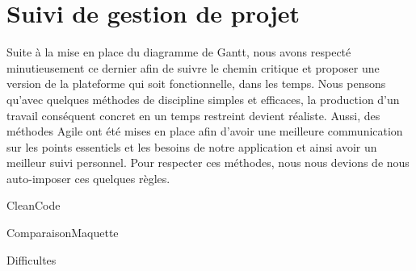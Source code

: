 \chapter{Suivi de gestion de projet}

Suite à la mise en place du diagramme de Gantt, nous avons respecté minutieusement ce dernier afin de suivre le chemin critique et proposer une version de la plateforme qui soit fonctionnelle, dans les temps. Nous pensons qu'avec quelques méthodes de discipline simples et efficaces, la production d'un travail conséquent concret en un temps restreint devient réaliste. Aussi, des méthodes Agile ont été mises en place afin d'avoir une meilleure communication sur les points essentiels et les besoins de notre application et ainsi avoir un meilleur suivi personnel. Pour respecter ces méthodes, nous nous devions de nous auto-imposer ces quelques règles.

{CleanCode}

{ComparaisonMaquette}

{Difficultes}
